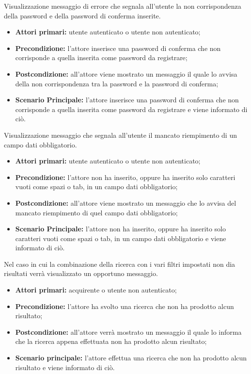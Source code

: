 Visualizzazione messaggio di errore che segnala all'utente la non corrispondenza della password e della password di conferma inserite.
\begin{itemize}
    \item \textbf{Attori primari:} utente autenticato o utente non autenticato;
    \item \textbf{Precondizione:} l'attore inserisce una password di conferma che non corrisponde a quella inserita come password da registrare;
    \item \textbf{Postcondizione:} all'attore viene mostrato un messaggio il quale lo avvisa della non corrispondenza tra la password e la password di conferma;
    \item \textbf{Scenario Principale:} l'attore inserisce una password di conferma che non corrisponde a quella inserita come password da registrare e viene informato di ciò.
\end{itemize}

Visualizzazione messaggio che segnala all'utente il mancato riempimento di un campo dati obbligatorio.
\begin{itemize}
    \item \textbf{Attori primari:} utente autenticato o utente non autenticato;
    \item \textbf{Precondizione:} l'attore non ha inserito, oppure ha inserito solo caratteri vuoti come spazi o tab, in un campo dati obbligatorio;
    \item \textbf{Postcondizione:} all'attore viene mostrato un messaggio che lo avvisa del mancato riempimento di quel campo dati obbligatorio;
    \item \textbf{Scenario Principale:} l'attore non ha inserito, oppure ha inserito solo caratteri vuoti come spazi o tab, in un campo dati obbligatorio e viene informato di ciò.
\end{itemize}


Nel caso in cui la combinazione della ricerca con i vari filtri impostati non dia risultati verrà visualizzato un opportuno messaggio.
\begin{itemize}
	\item \textbf{Attori primari:} acquirente o utente non autenticato;
	\item \textbf{Precondizione:} l'attore ha svolto una ricerca che non ha prodotto alcun risultato;
	\item \textbf{Postcondizione:} all'attore verrà mostrato un messaggio il quale lo informa che la ricerca appena effettuata non ha prodotto alcun risultato;
	\item \textbf{Scenario principale:} l'attore effettua una ricerca che non ha prodotto alcun risultato e viene informato di ciò.
\end{itemize}

